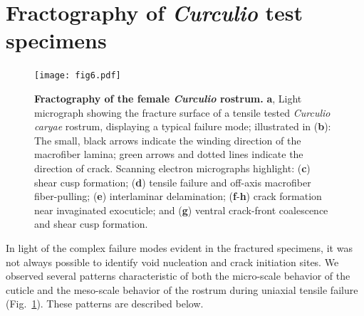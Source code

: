 \documentclass[twocolumn, linenumbers, superscriptaddress, nofootinbib]{revtex4-1}
\begin{document}
	\section{Fractography of \textit{Curculio} test specimens}
		
		\begin{figure}
			\centering
			\texttt{[image: fig6.pdf]}
			\caption{\textbf{Fractography of the female \textit{Curculio} rostrum.}
				\textbf{a}, Light micrograph showing the fracture surface of a tensile tested \textit{Curculio caryae} rostrum, displaying a typical failure mode; illustrated in (\textbf{b}):
				The small, black arrows indicate the winding direction of the macrofiber lamina; green arrows and dotted lines indicate the direction of crack.
				Scanning electron micrographs highlight: (\textbf{c}) shear cusp formation; (\textbf{d}) tensile failure and off-axis macrofiber fiber-pulling; (\textbf{e}) interlaminar delamination; (\textbf{f}-\textbf{h}) crack formation near invaginated exocuticle; and (\textbf{g}) ventral crack-front coalescence and shear cusp formation.
			}
			\label{fig::fracture}
		\end{figure}
		
		In light of the complex failure modes evident in the fractured specimens, it was not always possible to identify void nucleation and crack initiation sites.
		We observed several patterns characteristic of both the micro-scale behavior of the cuticle and the meso-scale behavior of the rostrum during uniaxial tensile failure (Fig.~\ref{fig::fracture}).
		These patterns are described below.
		
\end{document}

